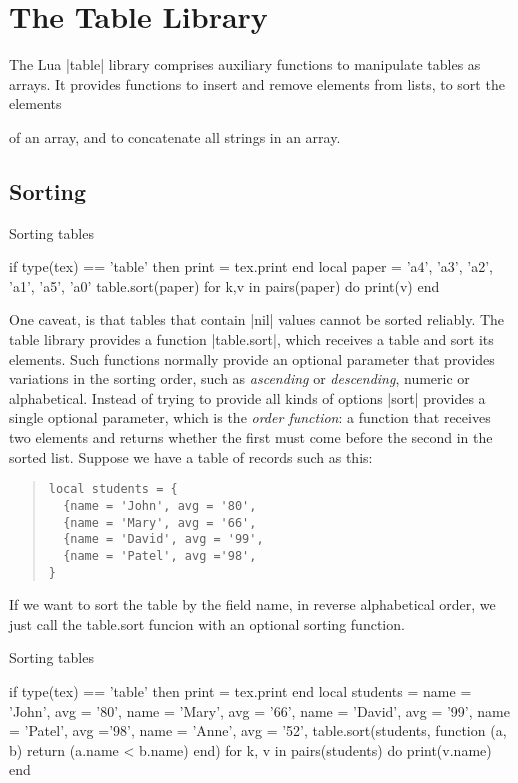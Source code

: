 \section{The Table Library}
The Lua |table| library comprises auxiliary functions to manipulate tables as arrays.
It provides functions to insert and remove elements from lists, to sort the elements

of an array, and to concatenate all strings in an array.
\subsection{Sorting}

\begin{texexample}{Sorting tables}{}
\begin{luacode}
if type(tex) == 'table' then print = tex.print end
local paper = {'a4', 'a3', 'a2', 'a1', 'a5', 'a0' }
table.sort(paper)
for k,v in pairs(paper) do
   print(v)
end
\end{luacode}
\end{texexample}

One caveat, is that tables that contain |nil| values cannot be sorted reliably. The table library provides a function |table.sort|, which receives a table and sort its elements. Such functions normally provide an optional parameter that provides variations in the sorting order, such as \emph{ascending} or \emph{descending}, numeric or alphabetical. Instead of trying to provide all kinds of options |sort| provides a single optional parameter, which is the \emph{order function}: a function that receives two elements and returns whether the first must come before the second in the 
sorted list. Suppose we have a table of records such as this:

\begin{quote}
\begin{verbatim}
local students = {
  {name = 'John', avg = '80',
  {name = 'Mary', avg = '66',
  {name = 'David', avg = '99', 
  {name = 'Patel', avg ='98',
}
\end{verbatim}
\end{quote}

If we want to sort the table by the field name, in reverse alphabetical order, we
just call the {\color{thered}\ttfamily table.sort}  funcion with an optional sorting function.

\begin{texexample}{Sorting tables}{}
\begin{luacode}
if type(tex) == 'table' then print = tex.print end
local students = {
  {name = 'John', avg = '80'},
  {name = 'Mary', avg = '66'},
  {name = 'David', avg = '99'}, 
  {name = 'Patel', avg ='98'},
  {name = 'Anne', avg = '52'},
}
table.sort(students, function (a, b) return (a.name < b.name) end)
for k, v in pairs(students) do
  print(v.name)
end
\end{luacode}
\end{texexample}

